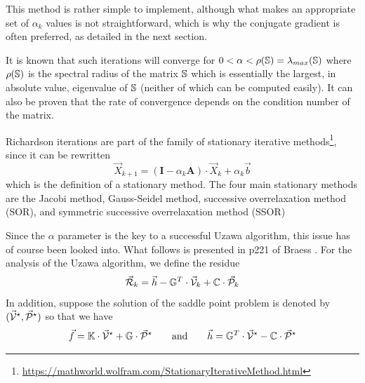 This method is rather simple to implement, although
what makes an appropriate set of $\alpha_k$ values is not straightforward, which is why 
the conjugate gradient is often preferred, as detailed in the next section. 

It is known that such iterations will converge for $0< \alpha < \rho({\mathbb{S}})= \lambda_{max}({\mathbb{S}})$ 
where $\rho({\mathbb{S}})$ is the spectral radius of the matrix ${\mathbb{S}}$
which is essentially the largest, in absolute value, eigenvalue of ${\mathbb{S}}$ (neither of which 
can be computed easily).  
It can also be proven that the rate of convergence depends on the condition number of the matrix.

Richardson iterations are part of the family of stationary iterative 
methods\footnote{\url{https://mathworld.wolfram.com/StationaryIterativeMethod.html}}, 
since it can be rewritten 
\begin{equation}
{\vec X}_{k+1} = ({\bm I} - \alpha_k {\bm A} ) \cdot {\vec X}_k + \alpha_k {\vec b}
\end{equation}
which is the definition of a stationary method. 
The four main stationary methods are the Jacobi method, 
Gauss-Seidel method, successive overrelaxation method (SOR), 
and symmetric successive overrelaxation method (SSOR)


Since the $\alpha$ parameter is the key to a successful Uzawa algorithm, 
this issue has of course been looked into. What follows is 
presented in p221 of Braess \cite{braess}.
For the analysis of the Uzawa algorithm, we define the residue
\[
\vec {\cal R}_k = \vec h - \mathbb{G}^T \cdot \vec{\cal V}_k  +{\mathbb{C}} \cdot \vec{\cal P}_{k}
\]
In addition, suppose the solution of the saddle point problem is denoted
by $(\vec{\cal V}^\star,\vec{\cal P}^\star)$ so that we have
\[
\vec{f} = {\mathbb{K}} \cdot \vec{\cal V}^\star + {\mathbb{G}} \cdot \vec{\cal P}^\star
\qquad
{\rm and}
\qquad
\vec{h} = {\mathbb{G}}^T \cdot \vec{\cal V}^\star - {\mathbb{C}} \cdot \vec{\cal P}^\star 
\]

